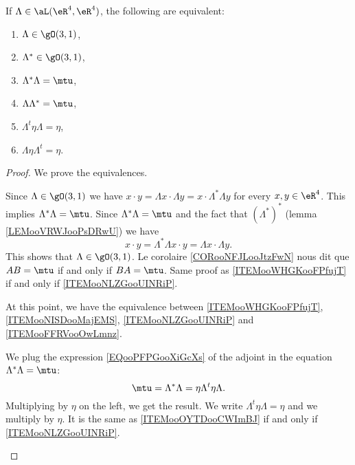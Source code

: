 \begin{lemma}       \label{LEMooDLWDooWCXlWq}
	If \( \Lambda\in \aL(\eR^4,\eR^4)\), the following are equivalent:
	\begin{enumerate}
		\item \( \Lambda\in\gO(3,1)\),      \label{ITEMooWHGKooFPfujT}
		\item \( \Lambda^*\in \gO(3,1)\),   \label{ITEMooNISDooMajEMS}
		\item \( \Lambda^*\Lambda=\mtu\),       \label{ITEMooNLZGooUINRiP}
		\item \( \Lambda\Lambda^*=\mtu\),       \label{ITEMooFFRVooOwLmnz}
		\item \( \Lambda^t\eta\Lambda=\eta\),       \label{ITEMooOYTDooCWImBJ}
		\item \( \Lambda\eta\Lambda^t=\eta\).       \label{ITEMooAEEYooDiJuEi}
	\end{enumerate}
\end{lemma}

\begin{proof}
	We prove the equivalences.
	\begin{subproof}
		Since \( \Lambda\in \gO(3,1)\) we have $x\cdot y=\Lambda x\cdot \Lambda y=x\cdot \Lambda^*\Lambda y$ for every \( x,y\in \eR^4\). This implies \( \Lambda^*\Lambda=\mtu\).
		Since \( \Lambda^*\Lambda=\mtu\) and the fact that \( (\Lambda^*)^*\) (lemma \ref{LEMooVRWJooPsDRwU}) we have
		\begin{equation}
			x\cdot y=\Lambda^*\Lambda x\cdot y=\Lambda x\cdot \Lambda y.
		\end{equation}
		This shows that \( \Lambda\in \gO(3,1)\).
		Le corolaire \ref{CORooNFJLooJtzFwN} nous dit que \( AB=\mtu\) if and only if \( BA=\mtu\).
		Same proof as \ref{ITEMooWHGKooFPfujT} if and only if \ref{ITEMooNLZGooUINRiP}.
	\end{subproof}
	At this point, we have the equivalence between \ref{ITEMooWHGKooFPfujT}, \ref{ITEMooNISDooMajEMS}, \ref{ITEMooNLZGooUINRiP} and \ref{ITEMooFFRVooOwLmnz}.
	\begin{subproof}
		We plug the expression \eqref{EQooPFPGooXiGcXs} of the adjoint in the equation \( \Lambda^*\Lambda=\mtu\):
		\begin{equation}
			\mtu=\Lambda^*\Lambda=\eta\Lambda^t\eta\Lambda.
		\end{equation}
		Multiplying by \( \eta\) on the left, we get the result.
		We write \( \Lambda^t\eta\Lambda=\eta\) and we multiply by \( \eta\).
		It is the same as \ref{ITEMooOYTDooCWImBJ} if and only if \ref{ITEMooNLZGooUINRiP}.
	\end{subproof}
\end{proof}

